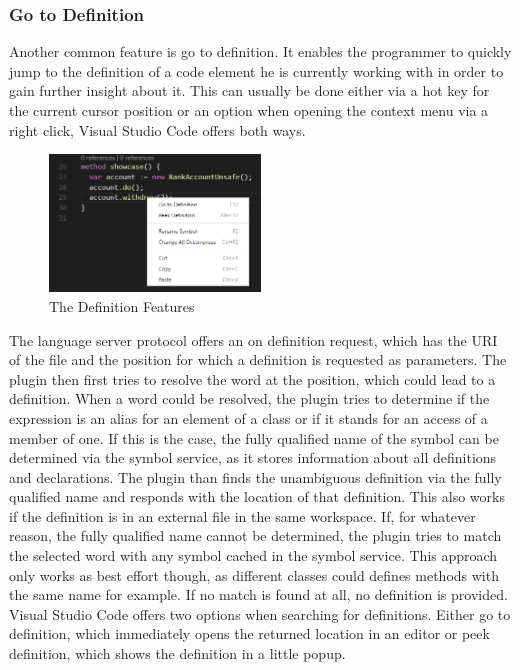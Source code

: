 \subsubsection{Go to Definition} \label{gotodefinition}
Another common feature is go to definition. It enables the programmer to quickly jump to the definition of a code element he is currently working with in order to gain further insight about it. This can usually be done either via a hot key for the current cursor position or an option when opening the context menu via a right click, Visual Studio Code offers both ways.\newline
\begin{figure}[H]
	\centering
	\includegraphics[width=0.5\textwidth]{img/goToDefinition}
	\caption{The Definition Features}
	\label{fig:gotodefinition}
\end{figure}
The language server protocol offers an on definition request, which has the URI of the file and the position for which a definition is requested as parameters. The plugin then first tries to resolve the word at the position, which could lead to a definition. When a word could be resolved, the plugin tries to determine if the expression is an alias for an element of a class or if it stands for an access of a member of one. If this is the case, the fully qualified name of the symbol can be determined via the symbol service, as it stores information about all definitions and declarations. The plugin than finds the unambiguous definition via the fully qualified name and responds with the location of that definition. This also works if the definition is in an external file in the same workspace. \newline
If, for whatever reason, the fully qualified name cannot be determined, the plugin tries to match the selected word with any symbol cached in the symbol service. This approach only works as best effort though, as different classes could defines methods with the same name for example. If no match is found at all, no definition is provided. \newline
Visual Studio Code offers two options when searching for definitions. Either go to definition, which immediately opens the returned location in an editor or peek definition, which shows the definition in a little popup. \newline

